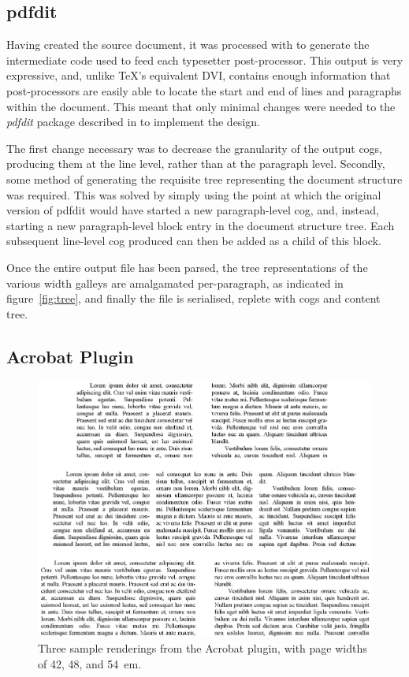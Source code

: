 \subsection{pdfdit}
Having created the source document, it was processed with \ditroff{} to generate the intermediate code used to feed each typesetter post-pro\-cessor. This output is very expressive, and, unlike \TeX's equivalent DVI, contains enough information that post-processors are easily able to locate the start and end of lines and paragraphs within the document. This meant that only minimal changes were needed to the \emph{pdfdit} package described in \cite{Bagley2003} to implement the design.

The first change necessary was to decrease the granularity of the output \gls{cog}s, producing them at the line level, rather than at the paragraph level. Secondly, some method of generating the requisite tree representing the document structure was required. This was solved by simply using the point at which the original version of pdfdit would have started a new paragraph-level \gls{cog}, and, instead, starting a new paragraph-level block entry in the document structure tree. Each subsequent line-level \gls{cog} produced can then be added as a child of this block.

Once the entire output file has been parsed, the tree representations of the various width galleys are amalgamated per-paragraph, as indicated in figure~\ref{fig:tree}, and finally the \pdf{} file is serialised, replete with \gls{cog}s and content tree.



\subsection{Acrobat Plugin}\label{sec:acroplugin}
\begin{figure}
 \includegraphics[width=\textwidth]{gfx/renderings}
 \caption[Sample renderings from the Acrobat plugin]{Three sample renderings from the Acrobat plugin, with page widths of 42, 48, and 54~em.}
 \label{fig:renderings}
\end{figure}

